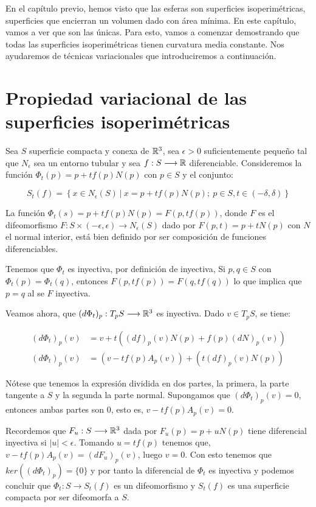 En el capítulo previo, hemos visto que las esferas son superficies isoperimétricas, superficies que encierran un volumen dado con área mínima. En este capítulo, vamos a ver que son las únicas. Para esto, vamos a comenzar demostrando que todas las superficies isoperimétricas tienen curvatura media constante. Nos ayudaremos de técnicas variacionales que introduciremos a continuación.

\section{Propiedad variacional de las superficies isoperimétricas}

Sea $S$ superficie compacta y conexa de $\mathbb{R}^3$, sea $\epsilon > 0$ suficientemente pequeño tal que $N_\epsilon$ sea un entorno tubular y sea $f: S \longrightarrow \mathbb{R}$ diferenciable. Consideremos la función $\Phi_t(p) = p + tf(p)N(p)$ con $p \in S$ y el conjunto:

\begin{equation*}
    S_t(f) = \left\{ x \in N_\epsilon(S) \ | \ x = p + tf(p)N(p); \ p \in S, t \in (-\delta, \delta) \right\}
\end{equation*}

La función $\Phi_t(s) = p + tf(p)N(p) = F(p, tf(p))$, donde $F$ es el difeomorfismo $F: S \times (-\epsilon, \epsilon) \longrightarrow N_\epsilon(S)$ dado por $F(p,t) = p + tN(p)$ con $N$ el normal interior, está bien definido por ser composición de funciones diferenciables.

Tenemos que $\Phi_t$ es inyectiva, por definición de inyectiva, Si $p,q \in S$ con $\Phi_t(p) = \Phi_t(q)$, entonces $F(p, tf(p)) = F(q, tf(q))$ lo que implica que $p=q$ al se $F$ inyectiva.

Veamos ahora, que $(d\Phi_t)_p: T_pS \longrightarrow \mathbb{R}^3$ es inyectiva. Dado $v \in T_pS$, se tiene:

\begin{align*}
    (d\Phi_t)_p(v) &= v + t((df)_p(v)N(p) + f(p)(dN)_p(v)) \\
    (d\Phi_t)_p(v) &= (v - tf(p)A_p(v)) + (t(df)_p(v)N(p))
\end{align*}

Nótese que tenemos la expresión dividida en dos partes, la primera, la parte tangente a $S$ y la segunda la parte normal. Supongamos que $(d\Phi_t)_p(v) = 0$, entonces ambas partes son $0$, esto es, $v - tf(p)A_p(v) = 0$.

Recordemos que $F_u: S \longrightarrow \mathbb{R}^3$ dada por $F_u(p) = p + uN(p)$ tiene diferencial inyectiva si $|u| < \epsilon$. Tomando $u=tf(p)$ tenemos que, $v - tf(p)A_p(v) = (dF_u)_p(v)$, luego $v=0$. Con esto tenemos que $ker((d\Phi_t)_p) = \{0\}$ y por tanto la diferencial de $\Phi_t$ es inyectiva y podemos concluir que $\Phi_t: S \longrightarrow S_t(f)$ es un difeomorfismo y $S_t(f)$ es una superficie compacta por ser difeomorfa a $S$.

